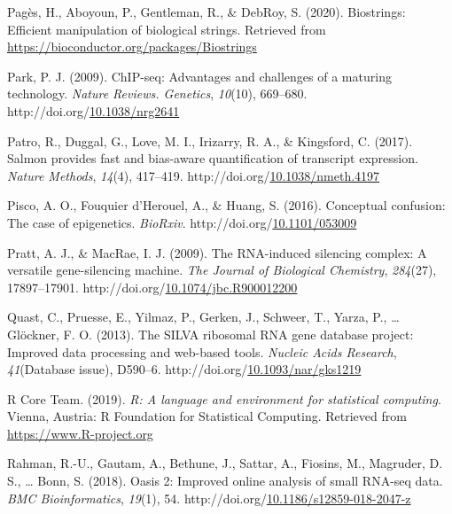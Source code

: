 \documentclass[12pt,twoside]{reedthesis}
\newlength{\cslhangindent}
\newenvironment{CSLReferences}[2] %
 {%
  \setlength{\parindent}{0pt}
  \ifodd #1 \everypar{\setlength{\hangindent}{\cslhangindent}}\ignorespaces\fi
  \ifnum #2 > 0
  \setlength{\parskip}{#2\baselineskip}
  \fi
 }%
 {}
\begin{document}
\begin{CSLReferences}{1}{0}
\leavevmode{}%
Pagès, H., Aboyoun, P., Gentleman, R., \& DebRoy, S. (2020). Biostrings: Efficient manipulation of biological strings. Retrieved from \url{https://bioconductor.org/packages/Biostrings}

\leavevmode{}%
Park, P. J. (2009). ChIP-seq: Advantages and challenges of a maturing technology. \emph{Nature Reviews. Genetics}, \emph{10}(10), 669--680. http://doi.org/\href{https://doi.org/10.1038/nrg2641}{10.1038/nrg2641}

\leavevmode{}%
Patro, R., Duggal, G., Love, M. I., Irizarry, R. A., \& Kingsford, C. (2017). Salmon provides fast and bias-aware quantification of transcript expression. \emph{Nature Methods}, \emph{14}(4), 417--419. http://doi.org/\href{https://doi.org/10.1038/nmeth.4197}{10.1038/nmeth.4197}

\leavevmode{}%
Pisco, A. O., Fouquier d'Herouel, A., \& Huang, S. (2016). Conceptual confusion: The case of epigenetics. \emph{BioRxiv}. http://doi.org/\href{https://doi.org/10.1101/053009}{10.1101/053009}

\leavevmode{}%
Pratt, A. J., \& MacRae, I. J. (2009). The RNA-induced silencing complex: A versatile gene-silencing machine. \emph{The Journal of Biological Chemistry}, \emph{284}(27), 17897--17901. http://doi.org/\href{https://doi.org/10.1074/jbc.R900012200}{10.1074/jbc.R900012200}

\leavevmode{}%
Quast, C., Pruesse, E., Yilmaz, P., Gerken, J., Schweer, T., Yarza, P., \ldots{} Glöckner, F. O. (2013). The SILVA ribosomal RNA gene database project: Improved data processing and web-based tools. \emph{Nucleic Acids Research}, \emph{41}(Database issue), D590--6. http://doi.org/\href{https://doi.org/10.1093/nar/gks1219}{10.1093/nar/gks1219}

\leavevmode{}%
R Core Team. (2019). \emph{R: A language and environment for statistical computing}. Vienna, Austria: R Foundation for Statistical Computing. Retrieved from \url{https://www.R-project.org}

\leavevmode{}%
Rahman, R.-U., Gautam, A., Bethune, J., Sattar, A., Fiosins, M., Magruder, D. S., \ldots{} Bonn, S. (2018). Oasis 2: Improved online analysis of small RNA-seq data. \emph{BMC Bioinformatics}, \emph{19}(1), 54. http://doi.org/\href{https://doi.org/10.1186/s12859-018-2047-z}{10.1186/s12859-018-2047-z}


\end{CSLReferences}
\end{document}

